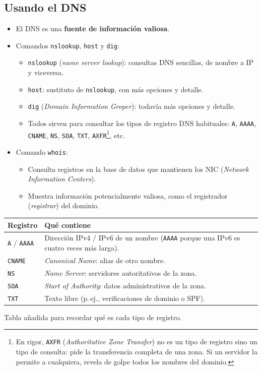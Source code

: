 \documentclass[11pt,a4paper]{report}
\begin{document}
\subsection{Usando el DNS}
 
\begin{itemize}
  \item El DNS es una \textbf{fuente de información valiosa}.
  \item Comandos \texttt{nslookup}, \texttt{host} y \texttt{dig}:
    \begin{itemize}
      \item \texttt{nslookup} (\emph{name server lookup}): consultas DNS sencillas, de nombre a IP y viceversa.
      \item \texttt{host}: sustituto de \texttt{nslookup}, con más opciones y detalle.
      \item \texttt{dig} (\emph{Domain Information Groper}): todavía más opciones y detalle.
      \item Todos sirven para consultar los tipos de registro DNS habituales: \texttt{A}, \texttt{AAAA}, \texttt{CNAME}, \texttt{NS}, \texttt{SOA}, \texttt{TXT}, \texttt{AXFR}\footnote{En rigor, \texttt{AXFR} (\emph{Authoritative Zone Transfer}) no es un tipo de registro sino un tipo de consulta: pide la transferencia completa de una zona. Si un servidor la permite a cualquiera, revela de golpe todos los nombres del dominio.}, etc.
    \end{itemize}
  \item Comando \texttt{whois}:
    \begin{itemize}
      \item Consulta registros en la base de datos que mantienen los NIC (\emph{Network Information Centers}).
      \item Muestra información potencialmente valiosa, como el registrador (\emph{registrar}) del dominio.
    \end{itemize}
\end{itemize}
 
\begin{center}
\small
{\setlength{\aboverulesep}{0pt}\setlength{\belowrulesep}{0pt}\renewcommand{\arraystretch}{1.3}%
\begin{tabularx}{\linewidth}{>{\raggedright\arraybackslash}p{2.0cm} !{\color{gray!45}\vrule width 0.2pt} >{\raggedright\arraybackslash}X}
\toprule
\textbf{Registro} & \textbf{Qué contiene} \\
\midrule
\texttt{A} / \texttt{AAAA} & Dirección IPv4 / IPv6 de un nombre (\texttt{AAAA} porque una IPv6 es cuatro veces más larga). \\
\texttt{CNAME} & \emph{Canonical Name}: alias de otro nombre. \\
\texttt{NS} & \emph{Name Server}: servidores autoritativos de la zona. \\
\texttt{SOA} & \emph{Start of Authority}: datos administrativos de la zona. \\
\texttt{TXT} & Texto libre (p.\,ej., verificaciones de dominio o SPF). \\
\bottomrule
\end{tabularx}}
\end{center}
{\small Tabla añadida para recordar qué es cada tipo de registro.}
 
\end{document}
